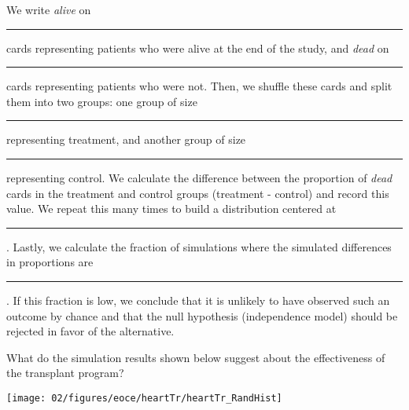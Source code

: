 {\begin{parts}
\begin{subparts}
\begin{adjustwidth}{2em}{2em}
We write \textit{alive} on \rule{2cm}{0.5pt} cards representing patients who were alive at the end of the study, and \textit{dead} on \rule{2cm}{0.5pt} cards representing patients who were not. Then, we shuffle these cards and split them into two groups: one group of size \rule{2cm}{0.5pt} representing treatment, and another group of size \rule{2cm}{0.5pt} representing control. We calculate the difference between the proportion of \textit{dead} cards in the treatment and control groups (treatment - control) and record this value. We repeat this many times to build a distribution centered at \rule{2cm}{0.5pt}. Lastly, we calculate the fraction of simulations where the simulated differences in proportions are \rule{2cm}{0.5pt}. If this fraction is low, we conclude that it is unlikely to have observed such an outcome by chance and that the null hypothesis (independence model) should be rejected in favor of the alternative.
\end{adjustwidth}
\item What do the simulation results shown below suggest about the effectiveness of the transplant program?
\end{subparts}
\end{parts}
\begin{center}
\texttt{[image: 02/figures/eoce/heartTr/heartTr\_RandHist]} \\
\end{center}
}{}



